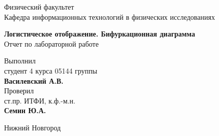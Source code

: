 

\makeatletter
\begin{titlepage}
	
	\newpage
	
    \noindent{}
    
	\vspace*{50pt}
    
	Физический факультет \\[\baselineskip]
    
	Кафедра информационных технологий в физических исследованиях

	\vspace*{100pt}

	{\Large\textbf{Логистическое отображение. Бифуркационная диаграмма}} \\[\baselineskip]

	Отчет по лабораторной работе

	\vspace*{\fill}

	\hfill\begin{minipage}{15em}
    	Выполнил\\
		студент 4 курса 05144 группы\\
		\textbf{Василевский А.В.}\\
		
		Проверил\\
		ст.пр. ИТФИ, к.ф.-м.н.\\
		\textbf{Семин Ю.А.}
    \end{minipage}
    
	
    
	\vspace*{\fill}
    
	Нижний Новгород\par
    
	
\end{titlepage}
\makeatother